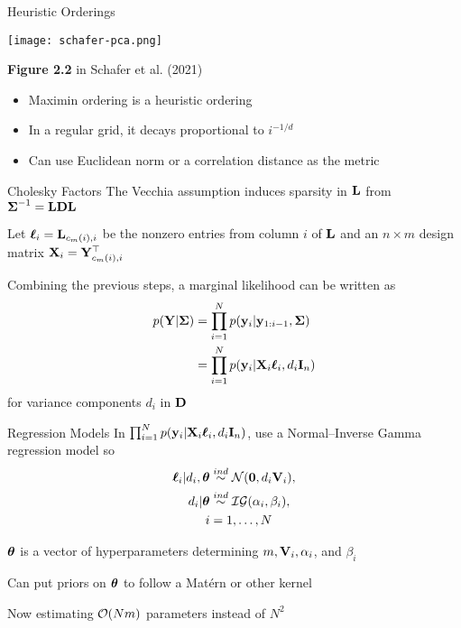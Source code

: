 \documentclass[letterpaper, 10pt, compress]{beamer}
\begin{document}
\begin{frame}{Heuristic Orderings}
    \begin{center}
        \texttt{[image: schafer-pca.png]}
    \end{center}
    \textbf{Figure 2.2} in Schafer et al. (2021) \cite{Schafer2021}
    \bigskip\par

    \begin{itemize}
        \item Maximin ordering is a heuristic ordering
        \item In a regular grid, it decays proportional to $i^{-1/d}$
        \item Can use Euclidean norm or a correlation distance as the metric
    \end{itemize}
\end{frame}

\begin{frame}{Cholesky Factors}
    The Vecchia assumption induces sparsity in $\mathbf{L}$ from $\boldsymbol{\Sigma}^{-1} = \mathbf{L} \mathbf{D} \mathbf{L}$ 
    \nocite{Huang2006}
    \medskip\par

    Let $\boldsymbol{\ell}_i = \mathbf{L}_{c_m(i), i}$ be the nonzero entries from column $i$ of $\mathbf{L}$
    and an $n \times m$ design matrix $\mathbf{X}_i = \mathbf{Y}_{c_m(i), i}^{\top}$
    \medskip\par

    Combining the previous steps, a marginal likelihood can be written as
    \begin{align*}
        p(\mathbf{Y} | \boldsymbol{\Sigma})
        &= \prod_{i=1}^{N} p(\mathbf{y}_i | \mathbf{y}_{1:i-1}, \boldsymbol{\Sigma}) \\
        &= \prod_{i=1}^{N} p(\mathbf{y}_i | \mathbf{X}_i \boldsymbol{\ell}_i, d_i \mathbf{I}_n)
    \end{align*}
    for variance components $d_i$ in $\mathbf{D}$
\end{frame}

\begin{frame}{Regression Models}
    In $\prod_{i=1}^{N} p(\mathbf{y}_i | \mathbf{X}_i \boldsymbol{\ell}_i, d_i \mathbf{I}_n)$, use a Normal--Inverse Gamma
    regression model so
    \begin{align*}
        \boldsymbol{\ell}_i | d_i, \boldsymbol{\theta} &\overset{ind}{\sim} \mathcal{N}(\mathbf{0}, d_i \mathbf{V}_i), \\
        d_i | \boldsymbol{\theta} &\overset{ind}{\sim} \mathcal{IG}(\alpha_i, \beta_i), \\
        i &= 1, \dots, N
    \end{align*}

    $\boldsymbol{\theta}$ is a vector of hyperparameters determining $m, \mathbf{V}_i, \alpha_i$, and $\beta_i$
    \medskip\par
    
    Can put priors on $\boldsymbol{\theta}$ to follow a Mat\'{e}rn or other kernel
    \medskip\par

    Now estimating $\mathcal{O}(Nm)$ parameters instead of $N^2$
\end{frame}
\end{document}
